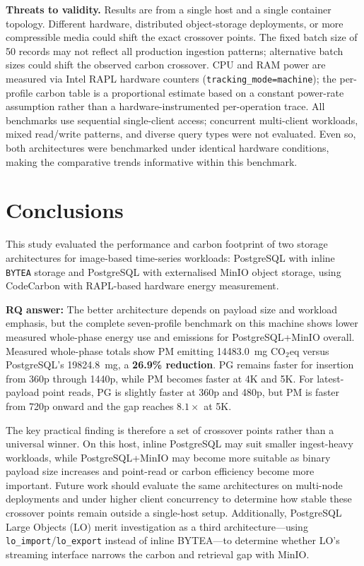 \documentclass[conference]{IEEEtran}
\begin{document}
\textbf{Threats to validity.} Results are from a single host and a single container topology. Different hardware, distributed object-storage deployments, or more compressible media could shift the exact crossover points. The fixed batch size of 50 records may not reflect all production ingestion patterns; alternative batch sizes could shift the observed carbon crossover. CPU and RAM power are measured via Intel RAPL hardware counters (\texttt{tracking\_mode=machine}); the per-profile carbon table is a proportional estimate based on a constant power-rate assumption rather than a hardware-instrumented per-operation trace. All benchmarks use sequential single-client access; concurrent multi-client workloads, mixed read/write patterns, and diverse query types were not evaluated. Even so, both architectures were benchmarked under identical hardware conditions, making the comparative trends informative within this benchmark.

\section{Conclusions}
\label{sec:conclusions}

This study evaluated the performance and carbon footprint of two storage architectures for image-based time-series workloads: PostgreSQL with inline \texttt{BYTEA} storage and PostgreSQL with externalised MinIO object storage, using CodeCarbon with RAPL-based hardware energy measurement.

\textbf{RQ answer:} The better architecture depends on payload size and workload emphasis, but the complete seven-profile benchmark on this machine shows lower measured whole-phase energy use and emissions for PostgreSQL+MinIO overall. Measured whole-phase totals show PM emitting 14483.0~mg CO$_2$eq versus PostgreSQL's 19824.8~mg, a \textbf{26.9\% reduction}. PG remains faster for insertion from 360p through 1440p, while PM becomes faster at 4K and 5K. For latest-payload point reads, PG is slightly faster at 360p and 480p, but PM is faster from 720p onward and the gap reaches $8.1\times$ at 5K.

The key practical finding is therefore a set of crossover points rather than a universal winner. On this host, inline PostgreSQL may suit smaller ingest-heavy workloads, while PostgreSQL+MinIO may become more suitable as binary payload size increases and point-read or carbon efficiency become more important. Future work should evaluate the same architectures on multi-node deployments and under higher client concurrency to determine how stable these crossover points remain outside a single-host setup. Additionally, PostgreSQL Large Objects (LO) merit investigation as a third architecture---using \texttt{lo\_import}/\texttt{lo\_export} instead of inline BYTEA---to determine whether LO's streaming interface narrows the carbon and retrieval gap with MinIO.
\end{document}
